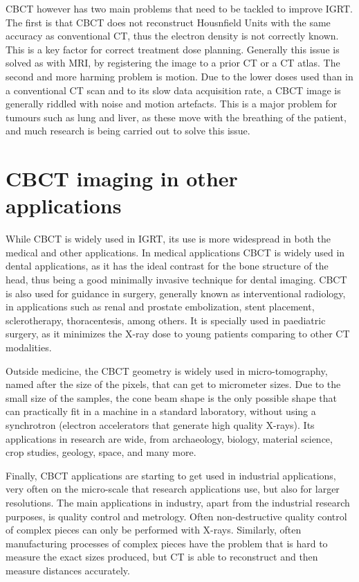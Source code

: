 CBCT however has two main problems that need to be tackled to improve IGRT. The first is that CBCT does not reconstruct Housnfield Units with the same accuracy as conventional CT, thus the electron density is not correctly known. This is a key factor for correct treatment dose planning. Generally this issue is solved as with MRI, by registering the image to a prior CT or a CT atlas. The second and more harming problem is motion. Due to the lower doses used than in a conventional CT scan and to its slow data acquisition rate, a CBCT image is generally riddled with noise and motion artefacts. This is a major problem for tumours such as lung and liver, as these move with the breathing of the patient, and much research is being carried out to solve this issue.


\section{CBCT imaging in other applications}

While CBCT is widely used in IGRT, its use is more widespread in both the medical and other applications. In medical applications CBCT is widely used in dental applications\cite{alamri2012applications}, as it has the ideal contrast for the bone structure of the head, thus being a good minimally invasive technique for dental imaging. CBCT is also used for guidance in surgery, generally known as interventional radiology, in applications such as renal and prostate embolization\cite{floridi2014c}, stent placement, sclerotherapy, thoracentesis\cite{Acord2017}, among others. It is specially used in paediatric surgery, as it minimizes the X-ray dose to young patients comparing to other CT modalities.

Outside medicine, the CBCT geometry is widely used in micro-tomography, named after the size of the pixels, that can get to micrometer sizes. Due to the small size of the samples, the cone beam shape is the only possible shape that can practically fit in a machine in a standard laboratory, without using a synchrotron (electron accelerators that generate high quality X-rays). Its applications in research are wide, from archaeology, biology, material science, crop studies, geology, space, and many more.

Finally, CBCT applications are starting to get used in industrial applications, very often on the micro-scale that research applications use, but also for larger resolutions. The main applications in industry, apart from the industrial research purposes, is quality control and metrology. Often non-destructive quality control of complex pieces can only be performed with X-rays. Similarly, often manufacturing processes of complex pieces have the problem that is hard to measure the exact sizes produced, but CT is able to reconstruct and then measure distances accurately.
